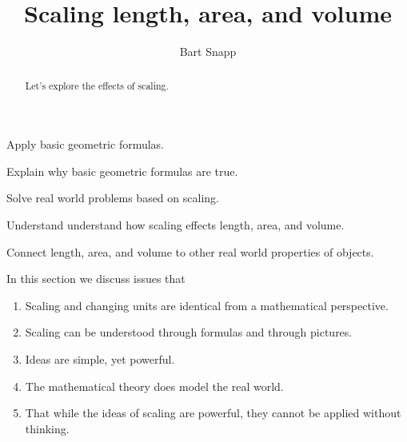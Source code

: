 \documentclass[handout,nooutcomes,noauthor]{ximera}
\title{Scaling length, area, and volume}
\author{Bart Snapp}
\begin{document}
\begin{abstract}
  Let's explore the effects of scaling.
\end{abstract}
\maketitle


\begin{listSectionOutcomes}
\item Apply basic geometric formulas. 
\item Explain why basic geometric formulas are true.
\item Solve real world problems based on scaling.
\item Understand understand how scaling effects length, area, and
  volume.
\item Connect length, area, and volume to other real world properties
  of objects.
\end{listSectionOutcomes}

In this section we discuss issues that

\begin{enumerate}
\item Scaling and changing units are identical from a mathematical
  perspective.
\item Scaling can be understood through formulas and through pictures.
\item Ideas are simple, yet powerful.
\item The mathematical theory does model the real world.
\item That while the ideas of scaling are powerful, they cannot be
  applied without thinking.
\end{enumerate}
\end{document}
